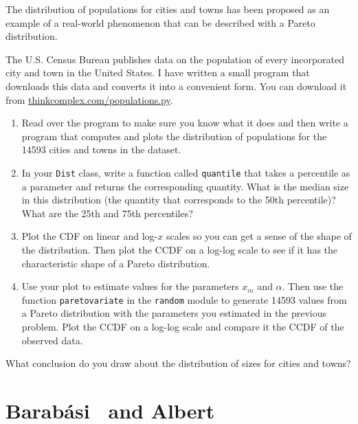 \documentclass[10pt]{book}
\begin{document}
\begin{ex}
The distribution of populations for cities and towns has been proposed
as an example of a real-world phenomenon that can be described
with a Pareto distribution.

The U.S. Census Bureau publishes data on the population of every
incorporated city and town in the United States.  I have written a
small program that downloads this data and converts it into a
convenient form.  You can download it from
\url{thinkcomplex.com/populations.py}.  

\begin{enumerate}

\item Read over the program to make sure you know what it does and then
  write a program that computes and plots the distribution of
  populations for the 14593 cities and towns in the dataset.

\item In your {\tt Dist} class, write a function called {\tt quantile}
  that takes a percentile as a parameter and returns the corresponding
  quantity.  What is the median size in this distribution (the
  quantity that corresponds to the 50th percentile)?  What are the
  25th and 75th percentiles?

\item Plot the CDF on linear and log-$x$ scales so you can get a sense
  of the shape of the distribution.  Then plot the CCDF on a log-log
  scale to see if it has the characteristic shape of a Pareto
  distribution.

\item Use your plot to estimate values for the parameters $x_m$ and
  $\alpha$.  Then use the function {\tt paretovariate} in the {\tt random}
  module to generate 14593 values from a Pareto distribution with the
  parameters you estimated in the previous problem.  Plot the CCDF on
  a log-log scale and compare it the CCDF of the observed data.

\end{enumerate}

What conclusion do you draw about the distribution of sizes
for cities and towns?

\end{ex}

\newcommand{\Barabasi}{Barab\'{a}si}

\section{\Barabasi~ and Albert}
\end{document}
